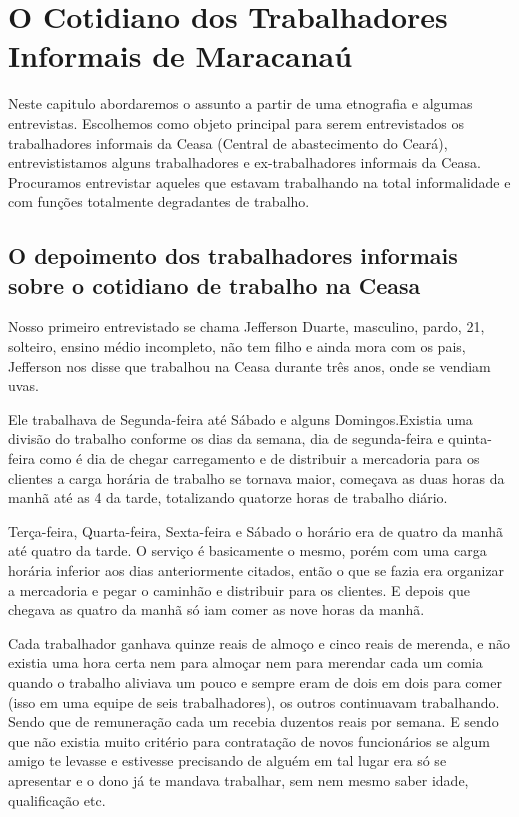 \chapter{O Cotidiano dos Trabalhadores Informais de Maracanaú}

 Neste capitulo abordaremos o assunto a partir de uma etnografia e algumas entrevistas. Escolhemos 
 como objeto principal para serem entrevistados os trabalhadores informais da Ceasa (Central de 
 abastecimento do Ceará), entrevististamos alguns trabalhadores e ex-trabalhadores informais da 
 Ceasa. Procuramos entrevistar aqueles que estavam trabalhando na total informalidade e com funções
 totalmente degradantes de trabalho.
 
 \section{O depoimento dos trabalhadores informais sobre o cotidiano de trabalho na Ceasa}
 
 Nosso primeiro entrevistado se chama Jefferson Duarte, masculino, pardo, 21, solteiro, ensino médio 
 incompleto, não tem filho e ainda mora com os pais, Jefferson nos disse que trabalhou na Ceasa 
 durante três anos, onde se vendiam uvas. 
 
 Ele trabalhava de Segunda-feira até Sábado e alguns Domingos.Existia uma divisão do trabalho conforme 
 os dias da semana, dia de segunda-feira e quinta-feira como é dia de chegar carregamento e de distribuir 
 a mercadoria para os clientes a carga horária de trabalho se tornava maior, começava as duas horas 
 da manhã até as 4 da tarde, totalizando quatorze horas de trabalho diário. 
 
 Terça-feira, Quarta-feira, Sexta-feira e Sábado o horário era de quatro
 da manhã até quatro da tarde. O serviço é basicamente o mesmo, porém com uma carga horária inferior
 aos dias anteriormente citados, então o que se fazia era organizar a mercadoria e pegar o caminhão
 e distribuir para os clientes. E depois que chegava as quatro da manhã só iam comer as nove horas
 da manhã. 
 
 Cada trabalhador ganhava quinze reais de almoço e cinco reais de merenda, e não existia 
 uma hora certa nem para almoçar nem para merendar cada um comia quando o trabalho aliviava um pouco 
 e sempre eram de dois em dois para comer (isso em uma equipe de seis trabalhadores), os outros 
 continuavam trabalhando. Sendo que de remuneração cada um recebia duzentos reais por semana. E 
 sendo que não existia muito critério para contratação de novos funcionários se algum amigo te 
 levasse e estivesse precisando de alguém em tal lugar era só se apresentar e o dono já te mandava 
 trabalhar, sem nem mesmo saber idade, qualificação etc.

